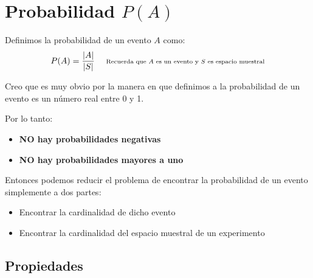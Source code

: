 \documentclass[12pt, fleqn]{report}                             %
\DeclareMathOperator \Space {\quad}                             %
\newcommand \Remember[1]{\Space\text{\scriptsize{#1}}}          %
\theoremstyle{break}                                            %
\begin{document}
        \clearpage
        \section{Probabilidad $P(A)$}

            Definimos la probabilidad de un evento $A$ como:
            \begin{equation*}
                P(A) = \frac{|A|}{|S|} \Remember{Recuerda que $A$ es un evento y $S$ es espacio muestral}
            \end{equation*}

            Creo que es muy obvio por la manera en que definimos a la probabilidad de un evento
            es un número real entre 0 y 1.

            Por lo tanto:
            \begin{itemize}
                \item \textbf{NO hay probabilidades negativas}
                \item \textbf{NO hay probabilidades mayores a uno}
            \end{itemize}

            Entonces podemos reducir el problema de encontrar la probabilidad de un evento
            simplemente a dos partes:
            \begin{itemize}
                \item Encontrar la cardinalidad de dicho evento
                \item Encontrar la cardinalidad del espacio muestral de un experimento 
            \end{itemize}


            \clearpage
            \subsection{Propiedades}
\end{document}

